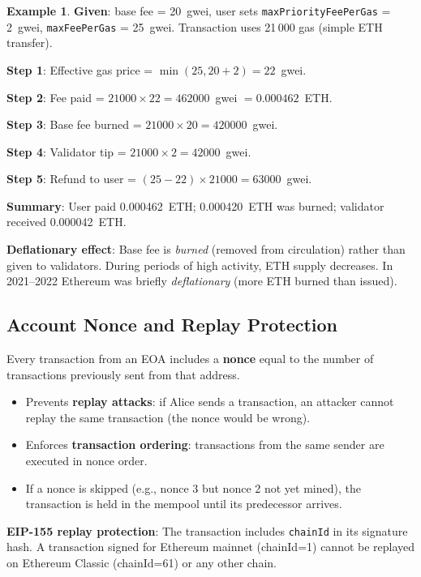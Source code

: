 \documentclass[12pt,a4paper,openany]{book}
\theoremstyle{definition}
\newtheorem{example}{Example}[chapter]
\theoremstyle{plain}
\theoremstyle{remark}
\begin{document}
\begin{example}
  \textbf{Given}: base fee = 20~gwei, user sets
  \texttt{maxPriorityFeePerGas} = 2~gwei,
  \texttt{maxFeePerGas} = 25~gwei.  Transaction uses 21\,000 gas
  (simple ETH transfer).

  \textbf{Step 1}: Effective gas price
  = $\min(25, 20+2) = 22$~gwei.

  \textbf{Step 2}: Fee paid = $21000\times22 = 462000$~gwei
  $= 0.000462$~ETH.

  \textbf{Step 3}: Base fee burned = $21000\times20 = 420000$~gwei.

  \textbf{Step 4}: Validator tip = $21000\times2 = 42000$~gwei.

  \textbf{Step 5}: Refund to user = $(25-22)\times21000 = 63000$~gwei.

  \textbf{Summary}: User paid 0.000462~ETH; 0.000420~ETH was burned;
  validator received 0.000042~ETH.
\end{example}

\begin{keyinsight}
  \textbf{Deflationary effect}: Base fee is \emph{burned} (removed from
  circulation) rather than given to validators.  During periods of high
  activity, ETH supply decreases.  In 2021--2022 Ethereum was briefly
  \emph{deflationary} (more ETH burned than issued).
\end{keyinsight}

\subsection{Account Nonce and Replay Protection}

Every transaction from an EOA includes a \textbf{nonce} equal to the
number of transactions previously sent from that address.

\begin{itemize}
  \item Prevents \textbf{replay attacks}: if Alice sends a transaction,
        an attacker cannot replay the same transaction (the nonce would
        be wrong).
  \item Enforces \textbf{transaction ordering}: transactions from the
        same sender are executed in nonce order.
  \item If a nonce is skipped (e.g., nonce 3 but nonce 2 not yet
        mined), the transaction is held in the mempool until its
        predecessor arrives.
\end{itemize}

\textbf{EIP-155 replay protection}: The transaction includes
\texttt{chainId} in its signature hash.  A transaction signed for
Ethereum mainnet (chainId=1) cannot be replayed on Ethereum Classic
(chainId=61) or any other chain.
\end{document}
